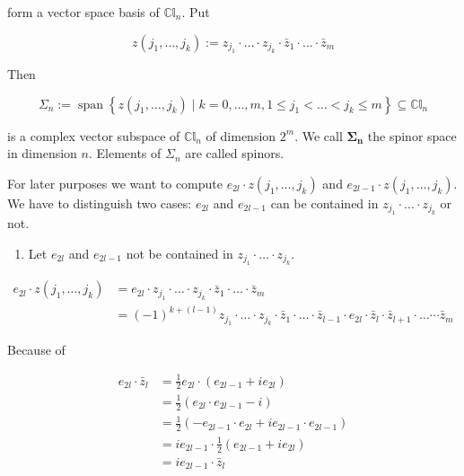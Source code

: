 \documentclass[10pt, letterpaper]{article}
\begin{document}
form a vector space basis of $\mathbb{C l}_{n}$. Put

$$
z\left(j_{1}, \ldots, j_{k}\right):=z_{j_{1}} \cdot \ldots \cdot z_{j_{k}} \cdot \bar{z}_{1} \cdot \ldots \cdot \bar{z}_{m}
$$

Then

$$
\Sigma_{n}:=\operatorname{span}\left\{z\left(j_{1}, \ldots, j_{k}\right) \mid k=0, \ldots, m, 1 \leq j_{1}<\ldots<j_{k} \leq m\right\} \subseteq \mathbb{C l}_{n}
$$

is a complex vector subspace of $\mathbb{C l}_{n}$ of dimension $2^{m}$. We call $\boldsymbol{\Sigma}_{\boldsymbol{n}}$ the spinor space in dimension $n$. Elements of $\Sigma_{n}$ are called spinors.

For later purposes we want to compute $e_{2 l} \cdot z\left(j_{1}, \ldots, j_{k}\right)$ and $e_{2 l-1} \cdot z\left(j_{1}, \ldots, j_{k}\right)$. We have to distinguish two cases: $e_{2 l}$ and $e_{2 l-1}$ can be contained in $z_{j_{1}} \cdot \ldots \cdot z_{j_{k}}$ or not.

\begin{enumerate}
  \item Let $e_{2 l}$ and $e_{2 l-1}$ not be contained in $z_{j_{1}} \cdot \ldots \cdot z_{j_{k}}$.
\end{enumerate}

$$
\begin{aligned}
e_{2 l} \cdot z\left(j_{1}, \ldots, j_{k}\right) & =e_{2 l} \cdot z_{j_{1}} \cdot \ldots \cdot z_{j_{k}} \cdot \bar{z}_{1} \cdot \ldots \cdot \bar{z}_{m} \\
& =(-1)^{k+(l-1)} z_{j_{1}} \cdot \ldots \cdot z_{j_{k}} \cdot \bar{z}_{1} \cdot \ldots \cdot \bar{z}_{l-1} \cdot e_{2 l} \cdot \bar{z}_{l} \cdot \bar{z}_{l+1} \cdot \ldots \cdots \bar{z}_{m}
\end{aligned}
$$

Because of

$$
\begin{aligned}
e_{2 l} \cdot \bar{z}_{l} & =\frac{1}{2} e_{2 l} \cdot\left(e_{2 l-1}+i e_{2 l}\right) \\
& =\frac{1}{2}\left(e_{2 l} \cdot e_{2 l-1}-i\right) \\
& =\frac{1}{2}\left(-e_{2 l-1} \cdot e_{2 l}+i e_{2 l-1} \cdot e_{2 l-1}\right) \\
& =i e_{2 l-1} \cdot \frac{1}{2}\left(e_{2 l-1}+i e_{2 l}\right) \\
& =i e_{2 l-1} \cdot \bar{z}_{l}
\end{aligned}
$$
\end{document}
